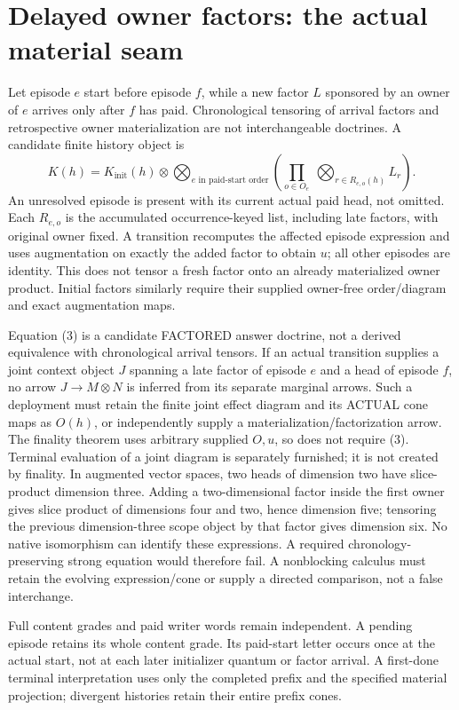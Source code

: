 \documentclass{article}
\begin{document}
\section{Delayed owner factors: the actual material seam}
Let episode $e$ start before episode $f$, while a new factor $L$ sponsored by an owner of $e$ arrives only after $f$ has paid. Chronological tensoring of arrival factors and retrospective owner materialization are not interchangeable doctrines. A candidate finite history object is
\[
 K(h)=K_{\mathrm{init}}(h)\otimes
       \bigotimes_{e\text{ in paid-start order}}
       \left(\prod_{o\in O_e}\ \bigotimes_{r\in R_{e,o}(h)}L_r\right).\tag{3}
\]
An unresolved episode is present with its current actual paid head, not omitted. Each $R_{e,o}$ is the accumulated occurrence-keyed list, including late factors, with original owner fixed. A transition recomputes the affected episode expression and uses augmentation on exactly the added factor to obtain $u$; all other episodes are identity. This does not tensor a fresh factor onto an already materialized owner product. Initial factors similarly require their supplied owner-free order/diagram and exact augmentation maps.

Equation (3) is a candidate FACTORED answer doctrine, not a derived equivalence with chronological arrival tensors. If an actual transition supplies a joint context object $J$ spanning a late factor of episode $e$ and a head of episode $f$, no arrow $J\to M\otimes N$ is inferred from its separate marginal arrows. Such a deployment must retain the finite joint effect diagram and its ACTUAL cone maps as $O(h)$, or independently supply a materialization/factorization arrow. The finality theorem uses arbitrary supplied $O,u$, so does not require (3). Terminal evaluation of a joint diagram is separately furnished; it is not created by finality. In augmented vector spaces, two heads of dimension two have slice-product dimension three. Adding a two-dimensional factor inside the first owner gives slice product of dimensions four and two, hence dimension five; tensoring the previous dimension-three scope object by that factor gives dimension six. No native isomorphism can identify these expressions. A required chronology-preserving strong equation would therefore fail. A nonblocking calculus must retain the evolving expression/cone or supply a directed comparison, not a false interchange.

Full content grades and paid writer words remain independent. A pending episode retains its whole content grade. Its paid-start letter occurs once at the actual start, not at each later initializer quantum or factor arrival. A first-done terminal interpretation uses only the completed prefix and the specified material projection; divergent histories retain their entire prefix cones.
\end{document}
